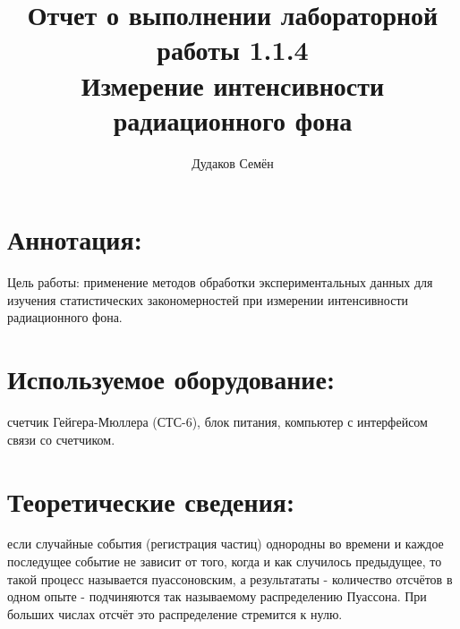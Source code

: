 \documentclass[a4paper, 10pt]{article}
\title{ Отчет о выполнении лабораторной работы 1.1.4 \\ \textbf{Измерение интенсивности радиационного фона}}
\author{Дудаков Семён}
\begin{document}
\maketitle
\section{Аннотация:} Цель работы: применение методов обработки экспериментальных данных для изучения статистических закономерностей при измерении интенсивности радиационного фона.

\section{Используемое оборудование:} счетчик Гейгера-Мюллера (СТС-6), блок питания, компьютер с интерфейсом связи со счетчиком.

\section{Теоретические сведения:} если случайные события (регистрация частиц) однородны во времени и каждое последущее событие не зависит от того, когда и как случилось предыдущее, то такой процесс называется пуассоновским, а результататы - количество отсчётов в одном опыте - подчиняются так называемому распределению Пуассона. При больших числах отсчёт это распределение стремится к нулю. 
\end{document}

